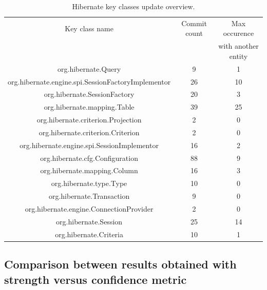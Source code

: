 \documentclass[runningheads]{comsis2}
\begin{document}
\begin{table}[!h]
\setlength\tabcolsep{3.5pt}
\caption{ Hibernate key classes update overview.}
\label{tab:overviewcommit:hibernate}
\centering
\begin{tabular}{|c|c|c|}
\hline
Key class name &	Commit count	&	Max occurence 	 \\
&		&	with another entity	 \\
\hline

org.hibernate.Query	&	9	&	1	\\
org.hibernate.engine.spi.SessionFactoryImplementor	&	26	&	10	\\
org.hibernate.SessionFactory	&	20	&	3	\\
org.hibernate.mapping.Table	&	39	&	25	\\
org.hibernate.criterion.Projection	&	2	&	0	\\
org.hibernate.criterion.Criterion	&	2	&	0	\\
org.hibernate.engine.spi.SessionImplementor	&	16	&	2	\\
org.hibernate.cfg.Configuration	&	88	&	9	\\
org.hibernate.mapping.Column	&	16	&	3	\\
org.hibernate.type.Type	&	10	&	0	\\
org.hibernate.Transaction	&	9	&	0	\\
org.hibernate.engine.ConnectionProvider	&	2	&	0	\\
org.hibernate.Session	&	25	&	14	\\
org.hibernate.Criteria	&	10	&	1	\\


\hline
\end{tabular}
\end{table}


\subsection{Comparison between results obtained with strength versus confidence metric}
\label{sec:measure_metrics}
\end{document}
